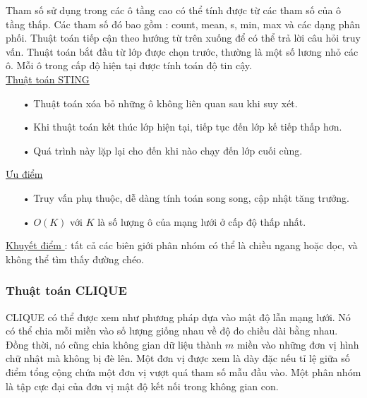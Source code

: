 \hspace{10mm}Tham số sử dụng trong các ô tầng cao có thể tính được từ các tham số của ô tầng thấp. Các tham số đó bao gồm : count, mean, s, min, max và các dạng phân phối. Thuật toán tiếp cận theo hướng từ trên xuống để có thể trả lời câu hỏi truy vấn. Thuật toán bắt đầu từ lớp được chọn trước, thường là một số lương nhỏ các ô. Mỗi ô trong cấp độ hiện tại được tính toán độ tin cậy.\\

\underline{Thuật toán STING}
\begin{enumerate}
\item[•]Thuật toán xóa bỏ những ô không liên quan sau khi suy xét.
\item[•]Khi thuật toán kết thúc lớp hiện tại, tiếp tục đến lớp kế tiếp thấp hơn.
\item[•]Quá trình này lặp lại cho đến khi nào chạy đến lớp cuối cùng. 
\end{enumerate}

\underline{Ưu điểm}
\begin{enumerate}
\item[•]Truy vấn phụ thuộc, dễ dàng tính toán song song, cập nhật tăng trưởng.
\item[•]$O(K)$ với $K$ là số lượng ô của mạng lưới ở cấp độ thấp nhất.
\end{enumerate}

\underline{Khuyết điểm }: 
tất cả các biên giới phân nhóm có thể là chiều ngang hoặc dọc, và không thể tìm thấy đường chéo.

\subsubsection{Thuật toán CLIQUE}
\hspace{10mm}CLIQUE có thể được xem như phương pháp dựa vào mật độ lẫn mạng lưới. Nó có thể chia mỗi miền vào số lượng giống nhau về độ đo chiều dài bằng nhau. Đồng thời, nó cũng chia không gian dữ liệu thành $m$ miền vào những đơn vị hình chữ nhật mà không bị đè lên. Một đơn vị được xem là dày đặc nếu tỉ lệ giữa số điểm tổng cộng chứa một đơn vị vượt quá tham số mẫu đầu vào. Một phân nhóm là tập cực đại của đơn vị mật độ kết nối trong không gian con.\\

